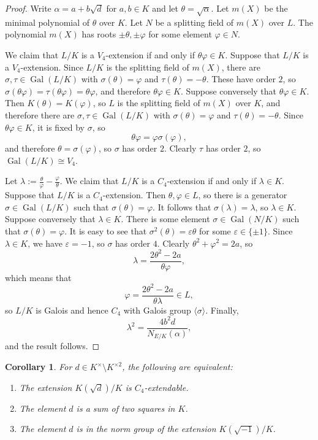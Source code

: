 \documentclass[11pt]{amsart}
\theoremstyle{theorem}
\newtheorem{corollary}[theorem]{Corollary}
\theoremstyle{example}
\theoremstyle{definition}
\numberwithin{theorem}{section}
\numberwithin{theorem}{section}
\DeclareMathOperator{\Gal}{Gal}
\begin{document}
\begin{proof}
    Write $\alpha = a + b\sqrt{d}$ for $a,b \in K$ and let $\theta = \sqrt{\alpha}$. Let $m(X)$ be the minimal polynomial of $\theta$ over $K$. Let $N$ be a splitting field of $m(X)$ over $L$. The polynomial $m(X)$ has roots $\pm \theta, \pm \varphi$ for some element $\varphi \in N$. 

    We claim that $L/K$ is a $V_4$-extension if and only if $\theta\varphi \in K$. Suppose that $L/K$ is a $V_4$-extension. Since $L/K$ is the splitting field of $m(X)$, there are $\sigma,\tau \in \Gal(L/K)$ with $\sigma(\theta) = \varphi$ and $\tau(\theta) = - \theta$. These have order $2$, so $\sigma(\theta\varphi) = \tau(\theta\varphi) = \theta\varphi$, and therefore $\theta\varphi \in K$. Suppose conversely that $\theta\varphi \in K$. Then $K(\theta) = K(\varphi)$, so $L$ is the splitting field of $m(X)$ over $K$, and therefore there are $\sigma,\tau \in \Gal(L/K)$ with $\sigma(\theta) = \varphi$ and $\tau(\theta) = - \theta$. Since $\theta\varphi \in K$, it is fixed by $\sigma$, so 
    $$
    \theta\varphi = \varphi\sigma(\varphi) ,
    $$
    and therefore $\theta = \sigma(\varphi)$, so $\sigma$ has order $2$. Clearly $\tau$ has order $2$, so $\Gal(L/K) \cong V_4$. 
    
    Let $\lambda := \frac{\theta}{\varphi} - \frac{\varphi}{\theta}$. We claim that $L/K$ is a $C_4$-extension if and only if $\lambda \in K$. Suppose that $L/K$ is a $C_4$-extension. Then $\theta, \varphi \in L$, so there is a generator $\sigma \in \Gal(L/K)$ such that $\sigma(\theta) = \varphi$. It follows that $\sigma(\lambda) = \lambda$, so $\lambda \in K$. Suppose conversely that $\lambda \in K$. There is some element $\sigma \in \Gal(N/K)$ such that $\sigma(\theta) = \varphi$. It is easy to see that $\sigma^2(\theta) = \varepsilon \theta$ for some $\varepsilon \in \{\pm 1\}$. Since $\lambda\in K$, we have $\varepsilon = - 1$, so $\sigma$ has order $4$. Clearly $\theta^2 + \varphi^2 = 2a$, so 
    $$
    \lambda = \frac{2\theta^2 - 2a}{\theta \varphi},
    $$
    which means that 
    $$
    \varphi = \frac{2\theta^2 - 2a}{\theta \lambda} \in L,
    $$
    so $L/K$ is Galois and hence $C_4$ with Galois group $\langle \sigma \rangle$. Finally, 
    $$
    \lambda^2 = \frac{4b^2d}{N_{E/K}(\alpha)},
    $$
    and the result follows. 
\end{proof}
\begin{corollary}
    \label{cor-extendable-iff-so2s}
    For $d \in K^\times \setminus K^{\times 2}$, the following are equivalent:
    \begin{enumerate} 
        \item The extension $K(\sqrt{d})/K$ is $C_4$-extendable.
        \item The element $d$ is a sum of two squares in $K$. 
        \item The element $d$ is in the norm group of the extension $K(\sqrt{-1})/K$.
    \end{enumerate}
\end{corollary}
\end{document}
